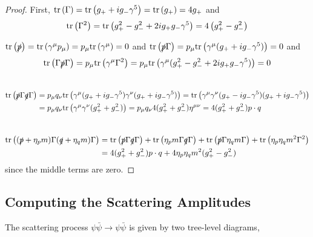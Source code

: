 \documentclass[12pt]{article}
\begin{document}
\begin{proof}

First, $\mathrm{tr} \left(  \Gamma  \right) = \mathrm{tr} \left(  g_{+} + i g_{-} \gamma^5  \right) = \mathrm{tr} \left(  g_{+}  \right) = 4 g_{+}$ and
 \[\mathrm{tr} \left(  \Gamma^2  \right) = \mathrm{tr} \left(  g_{+}^2 - g_{-}^2 + 2 i g_{+} g_{-} \gamma^5  \right) =  4 \left( g_{+}^2 - g_{-}^2 \right)\] 

$ \mathrm{tr} \left(  \slashed{p}  \right) = \mathrm{tr} \left(  \gamma^\mu p_\mu  \right) = p_\mu \mathrm{tr} \left(  \gamma^\mu \right) = 0 $ and $ \mathrm{tr} \left(  \slashed{p} \Gamma  \right) = p_\mu \mathrm{tr} \left(  \gamma^\mu (g_{+} + i g_{-} \gamma^5 )  \right) = 0$ and 
\[ \mathrm{tr} \left(  \Gamma \slashed{p} \Gamma  \right) = p_\mu \mathrm{tr} \left(  \gamma^\mu \Gamma^2 \right) = p_\mu \mathrm{tr} \left(  \gamma^\mu (g_{+}^2 - g_{-}^2 + 2 i g_{+} g_{-} \gamma^5)  \right) = 0 \]
\bigskip\\
\begin{align*} 
\mathrm{tr} \left(  \slashed{p} \Gamma \slashed{q} \Gamma  \right) & = p_\mu q_\nu \mathrm{tr} \left(  \gamma^\mu (g_{+} + i g_{-} \gamma^5 ) \gamma^\nu ( g_{+} + i g_{-} \gamma^5 )  \right)  = \mathrm{tr} \left(  \gamma^\mu \gamma^\nu ( g_{+} - i g_{-} \gamma^5) (g_{+} + i g_{-} \gamma^5)  \right) 
\\
& = p_{\mu} q_{\nu} \mathrm{tr} \left(  \gamma^\mu \gamma^\nu (g_{+}^2 + g_{-}^2)  \right) = p_\mu q_\nu 4 (g_{+}^2 + g_{-}^2)\eta^{\mu \nu} = 4 (g_{+}^2 + g_{-}^2)  p \cdot q 
\end{align*}
\bigskip\\
\begin{align*}
\mathrm{tr} \left(  (\slashed{p} + \eta_p m) \Gamma (\slashed{q} + \eta_q m) \Gamma  \right) & = \mathrm{tr} \left(  \slashed{p} \Gamma \slashed{q} \Gamma  \right) + \mathrm{tr} \left(  \eta_p m \Gamma \slashed{q} \Gamma  \right) + \mathrm{tr} \left(  \slashed{p} \Gamma \eta_q m \Gamma  \right) + \mathrm{tr} \left(  \eta_p \eta_q m^2 \Gamma^2  \right) 
\\
& = 4 ( g_{+}^2 + g_{-}^2) p \cdot q + 4 \eta_p \eta_q m^2 (g_{+}^2 - g_{-}^2) 
\end{align*}
since the middle terms are zero. 
\end{proof}

\subsection{Computing the Scattering Amplitudes}

The scattering process $\psi \bar{\psi} \to \psi \bar{\psi}$ is given by two tree-level diagrams,
\end{document}
